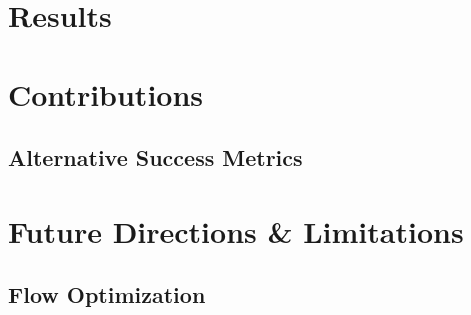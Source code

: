\documentclass[10pt]{article}
\begin{document}
\newpage
\section{Results}

\newpage
\section{Contributions}

\subsection{Alternative Success Metrics}

\newpage
\section{Future Directions \& Limitations}

\subsection{Flow Optimization}
\end{document}
